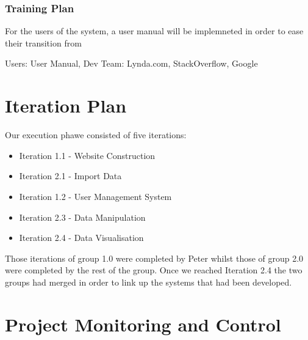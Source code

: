 
\subsubsection{Training Plan}

For the users of the system, a user manual will be implemneted in order to ease their transition from

	Users: User Manual, Dev Team: Lynda.com, StackOverflow, Google


\section{Iteration Plan}

Our execution phawe consisted of five iterations:
\begin{itemize}
	\item Iteration 1.1 - Website Construction
	\item Iteration 2.1 - Import Data 
	\item Iteration 1.2 - User Management System 
	\item Iteration 2.3 - Data Manipulation 
	\item Iteration 2.4 - Data Visualisation 
\end{itemize}

Those iterations of group 1.0 were completed by Peter whilst those of group 2.0 were completed by the rest of the group. Once we reached Iteration 2.4 the two groups had merged in order to link up the systems that had been developed.


\section{Project Monitoring and Control}


